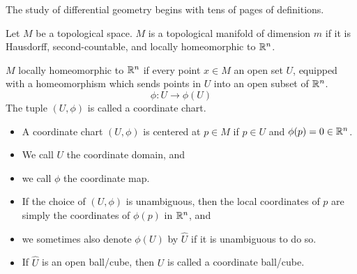 \documentclass[../main-manifolds.tex]{subfiles}
\begin{document}
\providecommand{\szz}{\mathcal{S}}
\providecommand{\ccinf}{C_c^\infty}

\providecommand{\Taux}{\Tau_\xx}
\providecommand{\Tauy}{\Tau_\yy}
\providecommand{\Tauxy}{\Tau_{\xx\times\yy}}

\providecommand{\Bx}{\borel_\xx}
\providecommand{\By}{\borel_\yy}
\providecommand{\Bxy}{\borel_{\xx\times\yy}}


\newpage
{}
The study of differential geometry begins with tens of pages of definitions.
\begin{definition}\label{lee-chp1:topological-manifold-definition}
    Let $M$ be a topological space. $M$ is a topological manifold of dimension $m$ if it is Hausdorff, second-countable, and locally homeomorphic to ${\mathbb{R}^n}$.
\end{definition}

\begin{definition}\label{lee-chp1:locally-homeomorphic-definition}
    $M$ locally homeomorphic to ${\mathbb{R}^n}$ if every point $x\in M$ an open set $U$, equipped with a homeomorphism which sends points in $U$ into an open subset of ${\mathbb{R}^n}$. 
    \[
        \phi: U\to \phi(U)
    \] 
    The tuple $(U,\phi)$ is called a coordinate chart.
\end{definition}

\begin{definition}\label{lee-chp1:coordinate-chart-definition}
    \begin{itemize}
        \item A coordinate chart $(U,\phi)$ is centered at $p\in M$ if $p\in U$ and $\phi(p)=0\in{\mathbb{R}^n}$.
        \item We call $U$ the coordinate domain, and
        \item we call $\phi$ the coordinate map.
        \item If the choice of $(U,\phi)$ is unambiguous, then the local coordinates of $p$ are simply the coordinates of $\phi(p)$ in ${\mathbb{R}^n}$, and
        \item we sometimes also denote $\phi(U)$ by $\hat{U}$ if it is unambiguous to do so.
        \item If $\hat{U}$ is an open ball/cube, then $U$ is called a coordinate ball/cube.
    \end{itemize}
\end{definition}
\end{document}
